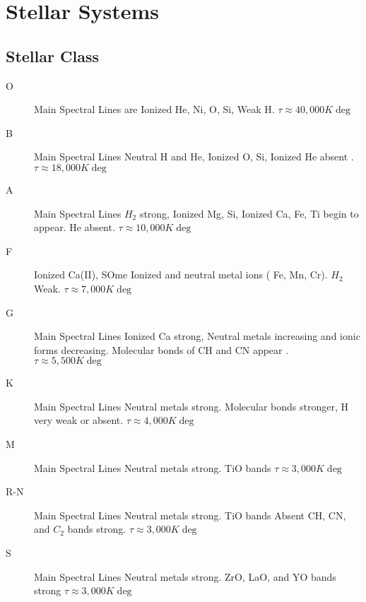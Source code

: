 \chapter{Stellar Systems}

\section{Stellar Class}

\begin{description}
	\item[O]
        Main Spectral Lines are Ionized He, Ni, O, Si, Weak H.
        \( \tau \approx 40,000 K \deg \)

	\item[B]
        Main Spectral Lines Neutral H and He, Ionized O, Si, Ionized 
	He absent .
        \( \tau \approx 18,000 K \deg \)

	\item[A]
        Main Spectral Lines \(H_2\) strong, Ionized Mg, Si, Ionized 
	Ca, Fe, Ti begin to appear. He absent.
        \( \tau \approx 10,000 K \deg \)

	\item[F]
        Ionized Ca(II), SOme Ionized and neutral metal ions ( Fe, Mn, 
	Cr). \(H_2\) Weak.
        \( \tau \approx 7,000 K \deg \)

	\item[G]
        Main Spectral Lines Ionized Ca strong, Neutral metals 
	increasing and ionic forms decreasing. Molecular bonds of CH 
	and CN appear .
        \( \tau \approx 5,500 K \deg \)

	\item[K]
        Main Spectral Lines Neutral metals strong. Molecular bonds 
	stronger, H very weak or absent.
        \( \tau \approx 4,000 K \deg \)

	\item[M]
        Main Spectral Lines Neutral metals strong. TiO bands 
        \( \tau \approx 3,000 K \deg \)

	\item[R-N]
        Main Spectral Lines Neutral metals strong. TiO bands Absent
        CH, CN, and \( C_2 \) bands strong.
        \( \tau \approx 3,000 K \deg \)
	
	\item[S]
        Main Spectral Lines Neutral metals strong. 
        ZrO, LaO, and YO bands strong
        \( \tau \approx 3,000 K \deg \)

\end{description}

